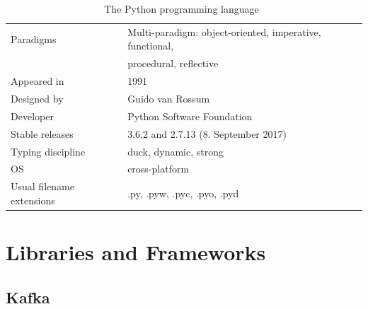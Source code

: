 \begin{table}
    \caption{The Python programming language~\cite{van2007python}}
    \label{table:python}
    \vspace{0.2cm}
    \begin{tabular}{l | l} %
        Paradigms
        & Multi-paradigm: object-oriented, imperative, functional,
        \\ & procedural, reflective
        \\ \midrule
        Appeared in
        & 1991
        \\ \midrule
        Designed by
        & Guido van Rossum
        \\ \midrule
        Developer
        & Python Software Foundation
        \\ \midrule
        Stable releases
        & 3.6.2 and 2.7.13 (8. September 2017)
        \\ \midrule
        Typing discipline
        & duck, dynamic, strong
        \\ \midrule
        OS
        & cross-platform
        \\ \midrule
        Usual filename extensions
        & .py, .pyw, .pyc, .pyo, .pyd
    \end{tabular}
\end{table}

\section{Libraries and Frameworks}
\label{sec:libraries}

\subsection{Kafka}
\label{subsec:kafka}

